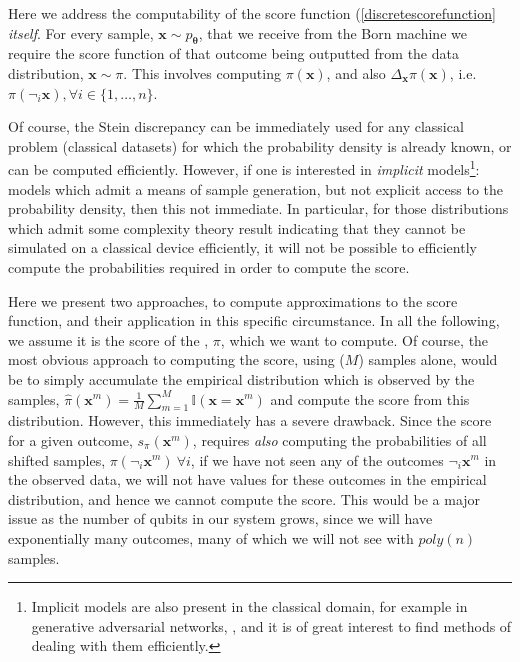 Here we address the computability of the score function (\eqref{discretescorefunction} \textit{itself}. For every sample, $\mathbf{x}\sim p_{\boldsymbol\theta}$, that we receive from the Born machine we require the score function of that outcome being outputted from the data distribution, $\mathbf{x} \sim \pi$. This involves computing $\pi(\mathbf{x})$, and also $\Delta_{\mathbf{x}}\pi(\mathbf{x})$, i.e.\@ $\pi(\neg_i\mathbf{x}), \forall i \in\{1, \dots, n\}$.

Of course, the Stein discrepancy can be immediately used for any classical problem (classical datasets) for which the probability density is already known, or can be computed efficiently. However, if one is interested in \textit{implicit} models\footnote{Implicit models are also present in the classical domain, for example in generative adversarial networks, , and it is of great interest to find methods of dealing with them efficiently.}: models which admit a means of sample generation, but not explicit access to the probability density, then this not immediate. In particular, for those distributions which admit some complexity theory result indicating that they cannot be simulated on a classical device efficiently, it will not be possible to efficiently compute the probabilities required in order to compute the score.

Here we present two approaches, to compute approximations to the score function, and their application in this specific circumstance. In all the following, we assume it is the score of the , $\pi$, which we want to compute. Of course, the most obvious approach to computing the score, using ($M$) samples alone, would be to simply accumulate the empirical distribution which is observed by the samples, $\hat{\pi}(\mathbf{x}^m) = \frac{1}{M}\sum_{m = 1}^M\mathbb{I}(\mathbf{x} = \mathbf{x}^m)$ and compute the score from this distribution. However, this immediately has a severe drawback. Since the score for a given outcome, $s_{\pi}(\mathbf{x}^m)$, requires \textit{also} computing the probabilities of all shifted samples, $\pi(\neg_i\mathbf{x}^m) ~ \forall i$, if we have not seen any of the outcomes $\neg_i\mathbf{x}^m$ in the observed data, we will not have values for these outcomes in the empirical distribution, and hence we cannot compute the score. This would be a major issue as the number of qubits in our system grows, since we will have exponentially many outcomes, many of which we will not see with $poly(n)$ samples.

